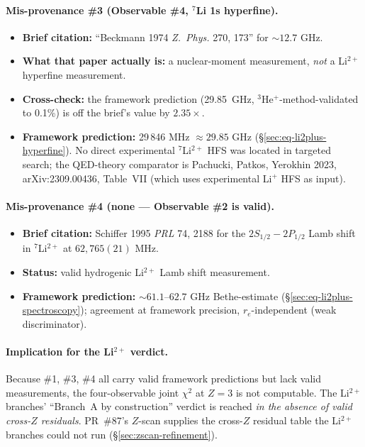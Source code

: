 \paragraph{Mis-provenance \#3 (Observable \#4, $^7$Li 1s hyperfine).}
\begin{itemize}[topsep=2pt,itemsep=0pt]
  \item \textbf{Brief citation:} ``Beckmann 1974 \emph{Z.~Phys.} 270, 173''
        for $\sim 12.7$ GHz.
  \item \textbf{What that paper actually is:} a nuclear-moment measurement,
        \emph{not} a Li$^{2+}$ hyperfine measurement.
  \item \textbf{Cross-check:} the framework prediction (29.85~GHz,
        $^3$He$^+$-method-validated to 0.1\%) is off the brief's value by
        $2.35\times$.
  \item \textbf{Framework prediction:} 29\,846 MHz $\approx 29.85$ GHz
        (\S\ref{sec:eq-li2plus-hyperfine}). No direct experimental
        $^7$Li$^{2+}$ HFS was located in targeted search; the QED-theory
        comparator is Pachucki, Patkos, Yerokhin 2023, arXiv:2309.00436,
        Table~VII (which uses experimental Li$^+$ HFS as input).
\end{itemize}

\paragraph{Mis-provenance \#4 (none --- Observable \#2 is valid).}
\begin{itemize}[topsep=2pt,itemsep=0pt]
  \item \textbf{Brief citation:} Schiffer 1995 \emph{PRL} 74, 2188 for the
        $2S_{1/2}{-}2P_{1/2}$ Lamb shift in $^7$Li$^{2+}$ at $62{,}765(21)$ MHz.
  \item \textbf{Status:} valid hydrogenic Li$^{2+}$ Lamb shift measurement.
  \item \textbf{Framework prediction:} $\sim 61.1$--$62.7$ GHz Bethe-estimate
        (\S\ref{sec:eq-li2plus-spectroscopy}); agreement at framework
        precision, $r_e$-independent (weak discriminator).
\end{itemize}

\paragraph{Implication for the Li$^{2+}$ verdict.}
Because \#1, \#3, \#4 all carry valid framework predictions but lack valid
measurements, the four-observable joint $\chi^2$ at $Z = 3$ is not
computable. The Li$^{2+}$ branches' ``Branch~A by construction'' verdict is
reached \emph{in the absence of valid cross-$Z$ residuals}. PR~\#87's
$Z$-scan supplies the cross-$Z$ residual table the Li$^{2+}$ branches could
not run (\S\ref{sec:zscan-refinement}).

